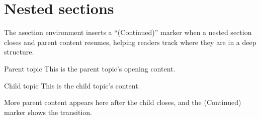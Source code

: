 \section{Nested sections}
The asection environment inserts a ``(Continued)'' marker when a nested section closes and parent content resumes, helping readers track where they are in a deep structure.

\begin{asection}{Parent topic}
This is the parent topic's opening content.

\begin{asection}{Child topic}
This is the child topic's content.
\end{asection}

More parent content appears here after the child closes, and the (Continued) marker shows the transition.
\end{asection}
